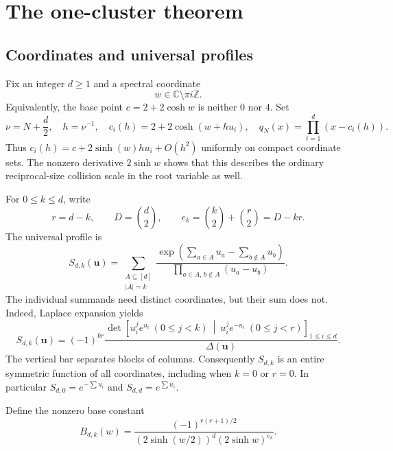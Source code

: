 \documentclass[11pt,a4paper]{article}
\numberwithin{equation}{section}
\theoremstyle{definition}
\theoremstyle{remark}
\newcommand{\CC}{\mathbb C}
\newcommand{\ZZ}{\mathbb Z}
\newcommand{\Del}{\Delta}
\newcommand{\bu}{\boldsymbol u}
\begin{document}
\section{The one-cluster theorem}\label{ic:sec:main}
\subsection{Coordinates and universal profiles}
Fix an integer $d\ge1$ and a spectral coordinate
\begin{equation}\label{ic:eq:nonendpoint}
 w\in\CC\setminus\pi i\ZZ.
\end{equation}
Equivalently, the base point $c=2+2\cosh w$ is neither $0$ nor $4$.
Set
\begin{equation}\label{ic:eq:moving}
 \nu=N+\frac d2,\quad h=\nu^{-1},\quad
 c_i(h)=2+2\cosh(w+hu_i),\quad
 q_N(x)=\prod_{i=1}^d(x-c_i(h)).
\end{equation}
Thus $c_i(h)=c+2\sinh(w)hu_i+O(h^2)$ uniformly on compact coordinate sets.
The nonzero derivative $2\sinh w$ shows that this describes the ordinary
reciprocal-size collision scale in the root variable as well.

For $0\le k\le d$, write
\begin{equation}\label{ic:eq:ke}
 r=d-k,\qquad D=\binom d2,\qquad
 e_k=\binom k2+\binom r2=D-kr.
\end{equation}
The universal profile is
\begin{equation}\label{ic:eq:Ssubset}
 S_{d,k}(\bu)=
 \sum_{\substack{A\subseteq[d]\\|A|=k}}
 \frac{\exp(\sum_{a\in A}u_a-\sum_{b\notin A}u_b)}
 {\displaystyle\prod_{a\in A,\,b\notin A}(u_a-u_b)}.
\end{equation}
The individual summands need distinct coordinates, but their sum does
not. Indeed, Laplace expansion yields
\begin{equation}\label{ic:eq:Sdet}
 S_{d,k}(\bu)=(-1)^{kr}
 \frac{\det\left[
       u_i^j e^{u_i}\ (0\le j<k)\ \middle|\
       u_i^j e^{-u_i}\ (0\le j<r)
      \right]_{1\le i\le d}}
 {\Del(\bu)}.
\end{equation}
The vertical bar separates blocks of columns. Consequently $S_{d,k}$ is
an entire symmetric function of all coordinates, including when $k=0$
or $r=0$. In particular $S_{d,0}=e^{-\sum u_i}$ and
$S_{d,d}=e^{\sum u_i}$.

Define the nonzero base constant
\begin{equation}\label{ic:eq:B}
 B_{d,k}(w)=
 \frac{(-1)^{r(r+1)/2}}
 {(2\sinh(w/2))^d(2\sinh w)^{e_k}}.
\end{equation}
\end{document}

